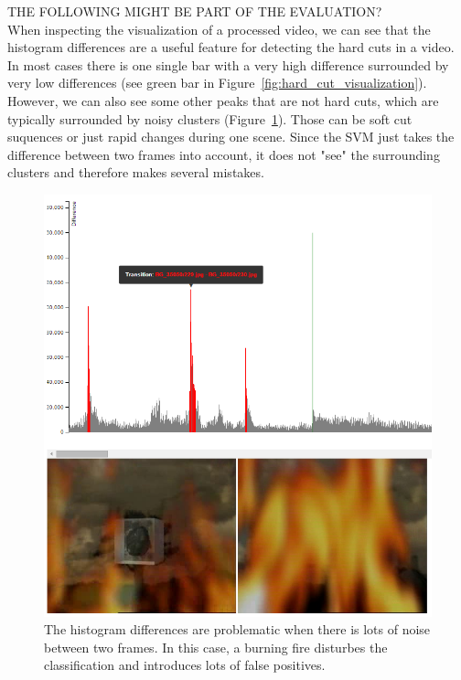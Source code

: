 THE FOLLOWING MIGHT BE PART OF THE EVALUATION? \\

When inspecting the visualization of a processed video, we can see that the histogram differences are a useful feature for detecting the hard cuts in a video.
In most cases there is one single bar with a very high difference surrounded by very low differences (see green bar in Figure~\ref{fig:hard_cut_visualization}).
However, we can also see some other peaks that are not hard cuts, which are typically surrounded by noisy clusters (Figure~\ref{fig:hard_cut_noise_visualization}).
Those can be soft cut suquences or just rapid changes during one scene.
Since the SVM just takes the difference between two frames into account, it does not "see" the surrounding clusters and therefore makes several mistakes.

\begin{figure}
	\centering
	\includegraphics[scale=.7]{images/hard_cut_noise_visualization.png}
	\caption{The histogram differences are problematic when there is lots of noise between two frames. In this case, a burning fire disturbes the classification and introduces lots of false positives.}
	\label{fig:hard_cut_noise_visualization}
\end{figure}